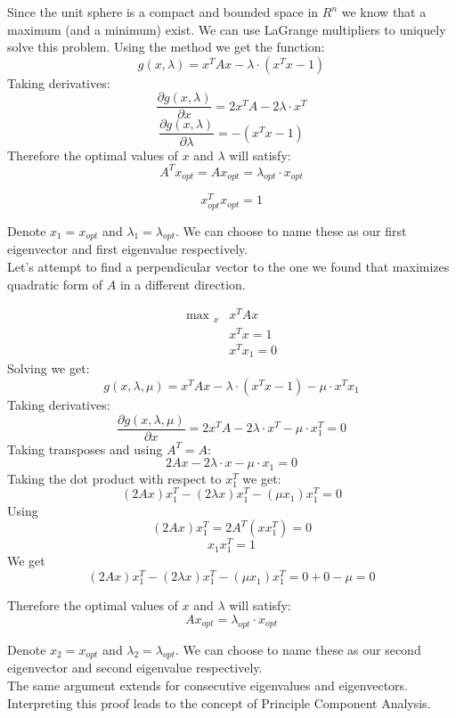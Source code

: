 \documentclass[a4paper]{article}
\begin{document}
Since the unit sphere is a compact and bounded space in $R^n$ we know that a maximum (and a minimum) exist.  We can use LaGrange multipliers to uniquely solve this problem. Using the method we get the function:
$$
g(x, \lambda) = x^{T} A x - \lambda \cdot (x^{T} x - 1)
$$
Taking derivatives:
$$
\frac{\partial g(x, \lambda) }{\partial x} = 2x^T A - 2\lambda \cdot x^T  
$$
$$
\frac{\partial g(x, \lambda) }{\partial \lambda} = - (x^{T} x - 1) 
$$
Therefore the optimal values of $x$ and $\lambda$ will satisfy:
\begin{equation}
A^{T} x_{opt}= A x_{opt} = \lambda_{opt} \cdot x_{opt} 
\end{equation}

\begin{equation}
x_{opt}^{T} x_{opt} = 1
\end{equation}

Denote $x_1 = x_{opt}$ and $\lambda_1 = \lambda_{opt}$. We can choose to name these as our first eigenvector and first eigenvalue respectively. \\

Let's attempt to find a perpendicular vector to the one we found that maximizes quadratic form of $A$ in a different direction. 

\begin{align}
\text{max }_{x}  & x^{T} A x \\ 
& x^{T} x = 1 \nonumber \\ 
& x^{T} x_1 = 0  \nonumber 
\end{align}
Solving we get:
$$
g(x, \lambda, \mu) = x^{T} A x - \lambda \cdot (x^{T} x - 1) - \mu \cdot x^{T} x_1
$$
Taking derivatives:
$$
\frac{\partial g(x, \lambda, \mu) }{\partial x} = 2 x^{T}A - 2 \lambda \cdot x^{T}  - \mu \cdot x_{1}^{T} = 0
$$
Taking transposes and using $A^{T} = A$:
$$
2 Ax - 2 \lambda \cdot x  - \mu \cdot x_{1} = 0
$$
Taking the dot product with respect to $x_{1}^{T}$ we get:
$$
(2Ax)x_{1}^{T} - (2 \lambda  x) x_{1}^{T}  - (\mu  x_1)x_{1}^{T} = 0
$$
Using
$$
(2Ax) x_{1}^{T} = 2 A^{T} (x x_{1}^{T}) = 0
$$
$$
x_1 x_{1}^{T} = 1
$$
We get
$$
(2Ax)x_{1}^{T} - (2 \lambda  x) x_{1}^{T}  - (\mu  x_1)x_{1}^{T} = 0 + 0 - \mu = 0 
$$

Therefore the optimal values of $x$ and $\lambda$ will satisfy:
\begin{equation}
A x_{opt} = \lambda_{opt} \cdot x_{opt} 
\end{equation}

Denote $x_2 = x_{opt}$ and $\lambda_2 = \lambda_{opt}$. We can choose to name these as our second eigenvector and second eigenvalue respectively. \\

The same argument extends for consecutive eigenvalues and eigenvectors. \\
Interpreting this proof leads to the concept of Principle Component Analysis. 
\end{document}

